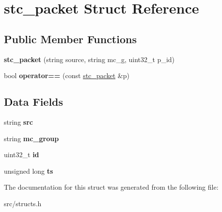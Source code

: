\hypertarget{structstc__packet}{\section{stc\-\_\-packet Struct Reference}
\label{structstc__packet}
}
\subsection*{Public Member Functions}
\begin{DoxyCompactItemize}
\item 
\hypertarget{structstc__packet_a797f8f9c8d35e9a99b7afa4185109bee}{{\bfseries stc\-\_\-packet} (string source, string mc\-\_\-g, uint32\-\_\-t p\-\_\-id)}\label{structstc__packet_a797f8f9c8d35e9a99b7afa4185109bee}

\item 
\hypertarget{structstc__packet_a57afe0090b0d85952b3e1b7d2b6aced1}{bool {\bfseries operator==} (const \hyperlink{structstc__packet}{stc\-\_\-packet} \&p)}\label{structstc__packet_a57afe0090b0d85952b3e1b7d2b6aced1}

\end{DoxyCompactItemize}
\subsection*{Data Fields}
\begin{DoxyCompactItemize}
\item 
\hypertarget{structstc__packet_ad9a994b0dae353114552760e5a7e2669}{string {\bfseries src}}\label{structstc__packet_ad9a994b0dae353114552760e5a7e2669}

\item 
\hypertarget{structstc__packet_aa568f4dbc7e2889b4749abfa75c0bd0e}{string {\bfseries mc\-\_\-group}}\label{structstc__packet_aa568f4dbc7e2889b4749abfa75c0bd0e}

\item 
\hypertarget{structstc__packet_aa68a7faca167465473001a68aa673df6}{uint32\-\_\-t {\bfseries id}}\label{structstc__packet_aa68a7faca167465473001a68aa673df6}

\item 
\hypertarget{structstc__packet_a9afbe85ef7a2a91b8332ea1022fec75e}{unsigned long {\bfseries ts}}\label{structstc__packet_a9afbe85ef7a2a91b8332ea1022fec75e}

\end{DoxyCompactItemize}


The documentation for this struct was generated from the following file\-:\begin{DoxyCompactItemize}
\item 
src/structs.\-h\end{DoxyCompactItemize}
